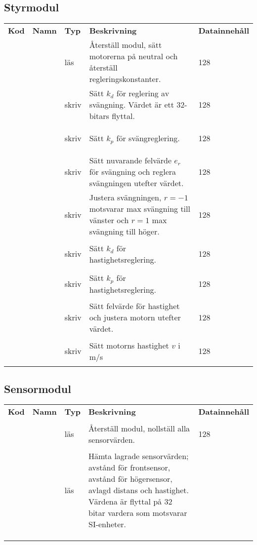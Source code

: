 \documentclass{tekniskrapport/tech.tex}
\makeatletter
\newenvironment{cmdlist}
{
    \renewcommand{\arraystretch}{1.8}
    \begin{table}[H]
        \centering
        \setlength{\tabcolsep}{8pt}
        \begin{tabular}{@{}m{0.8cm}m{1.3cm}m{0.9cm}m{8cm}m{3cm}}
            \bfseries Kod &
            \bfseries Namn &
            \bfseries Typ &
            \bfseries Beskrivning &
            \bfseries Datainnehåll \\
}{
        \end{tabular}
    \end{table}
}
\newcommand{\cmd}[5]{
    \mono{0x#1} & \mono{#2} & #3 & #4 &
    {\begin{bytefield}[bitwidth=0.4mm]{128}
    #5
    \end{bytefield}}\\
}
\makeatother
\begin{document}
\subsection{Styrmodul}

\begin{cmdlist}
\cmd{01}{RESET}{läs}{Återställ modul, sätt motorerna på neutral och återställ
    regleringskonstanter.}{}
\cmd{08}{ROT\_KD}{skriv}{Sätt $k_d$ för reglering av svängning. Värdet är ett
    32-bitars flyttal.}{\bitbox{32}{$k_d$}}
\cmd{09}{ROT\_KP}{skriv}{Sätt $k_p$ för svängreglering.}{\bitbox{32}{$k_p$}}
\cmd{0a}{ROT\_ERR}{skriv}{Sätt nuvarande felvärde $e_r$ för svängning och
    reglera svängningen utefter värdet.}{\bitbox{32}{$e_r$}}
\cmd{0b}{ROT\_VAL}{skriv}{Justera svängningen, $r=-1$ motsvarar max svängning
    till vänster och $r=1$ max svängning till höger.}{\bitbox{32}{$r$}}
\cmd{0c}{VEL\_KD}{skriv}{Sätt $k_d$ för
    hastighetsreglering.}{\bitbox{32}{$k_d$}}
\cmd{0d}{VEL\_KP}{skriv}{Sätt $k_p$ för
    hastighetsreglering.}{\bitbox{32}{$k_p$}}
\cmd{0e}{VEL\_ERR}{skriv}{Sätt felvärde för hastighet och justera motorn
    utefter värdet.}{\bitbox{32}{$e_v$}}
\cmd{0f}{VEL\_VAL}{skriv}{Sätt motorns hastighet $v$ i m/s}{\bitbox{32}{$v$}}
\end{cmdlist}

\vspace{5mm}
\subsection{Sensormodul}

\begin{cmdlist}
\cmd{01}{RESET}{läs}{Återställ modul, nollställ alla sensorvärden.}{
}
\cmd{03}{GET}{läs}{Hämta lagrade sensorvärden; avstånd för frontsensor, avstånd
    för högersensor, avlagd distans och hastighet. Värdena är flyttal på 32
    bitar vardera som motsvarar SI-enheter.}{
    \bitbox{32}{$d_f$}\\
    \bitbox{32}{$d_r$}\\
    \bitbox{32}{$d$}\\
    \bitbox{32}{$v$}
}
\end{cmdlist}
\end{document}
